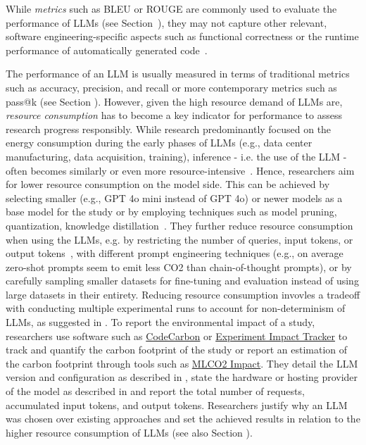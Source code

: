 While \emph{metrics} such as BLEU or ROUGE are commonly used to evaluate the performance of LLMs (see Section~\benchmarksmetrics), they may not capture other relevant, software engineering-specific aspects such as functional correctness or the runtime performance of automatically generated code~\cite{DBLP:conf/nips/LiuXW023}.

The performance of an LLM is usually measured in terms of traditional metrics such as accuracy, precision, and recall or more contemporary metrics such as pass@k (see Section \benchmarksmetrics).
However, given the high resource demand of LLMs are, \emph{resource consumption} has to become a key indicator for performance to assess research progress responsibly. 
While research predominantly focused on the energy consumption during the early phases of LLMs (e.g., data center manufacturing, data acquisition, training), inference - i.e. the use of the LLM - often becomes similarly or even more resource-intensive~\cite{de2023growing, DBLP:conf/mlsys/WuRGAAMCBHBGGOM22, DBLP:journals/corr/abs-2410-02950, JIANG2024202, mitu2024hidden}.
Hence, researchers  \should aim for lower resource consumption on the model side.
This can be achieved by selecting smaller (e.g., GPT 4o mini instead of GPT 4o) or newer models as a base model for the study or by employing techniques such as model pruning, quantization, knowledge distillation~\cite{mitu2024hidden}.
They \may further reduce resource consumption when using the LLMs, e.g. by restricting the number of queries, input tokens, or output tokens~\cite{mitu2024hidden}, with different prompt engineering techniques (e.g., on average zero-shot prompts seem to emit less CO2 than chain-of-thought prompts), or by carefully sampling smaller datasets for fine-tuning and evaluation instead of using large datasets in their entirety.
Reducing resource consumption invovles a tradeoff with conducting multiple experimental runs to account for non-determinism of LLMs, as suggested in \benchmarksmetrics.
To report the environmental impact of a study, researchers \should use software such as \href{https://github.com/mlco2/codecarbon}{CodeCarbon} or \href{experiment-impact-tracker}{Experiment Impact Tracker} to track and quantify the carbon footprint of the study or report an estimation of the carbon footprint through tools such as \href{https://mlco2.github.io/impact/#about}{MLCO2 Impact}.
They \should detail the LLM version and configuration as described in \modelversion, state the hardware or hosting provider of the model as described in \toolarchitecture and report the total number of requests, accumulated input tokens, and output tokens.
Researchers \must justify why an LLM was chosen over existing approaches and set the achieved results in relation to the higher resource consumption of LLMs (see also Section \benchmarksmetrics).


